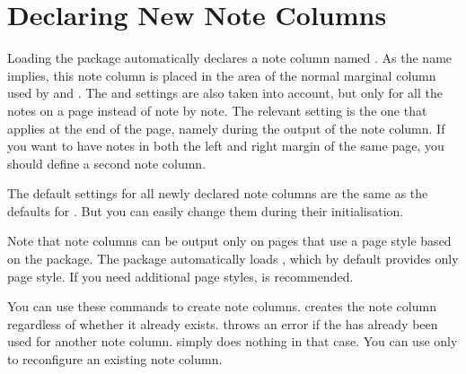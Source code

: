 \section{Declaring New Note Columns}

Loading the package automatically declares a note column named
. As the name implies, this note column is placed in the
area of the normal marginal column used by  and
. The  and
 settings are also taken into account, but only for all
the notes on a page instead of note by note. The relevant setting is the one
that applies at the end of the page, namely during the output of the note
column. If you want to have notes in both the left and right margin of the
same page, you should define a second note column.

The default settings for all newly declared note columns are the same as the
defaults for . %
\iftrue%
But you can easily change them during their initialisation.%
\fi

Note that note columns can be output only on pages that
use a page style based on the
\hyperref[cha:scrlayer]{}%
 package. The
 package automatically loads
\hyperref[cha:scrlayer]{}, which by default provides only
 page style. If you need additional
page styles, \hyperref[cha:scrlayer-scrpage]{}%
%
 is
recommended.

\begin{Declaration}
\end{Declaration}
You can use these commands to create note columns. 
creates the note column regardless of whether it already exists.
 throws an error if the 
has already been used for another note column. 
simply does nothing in that case. You can use  only
to reconfigure an existing note column.

